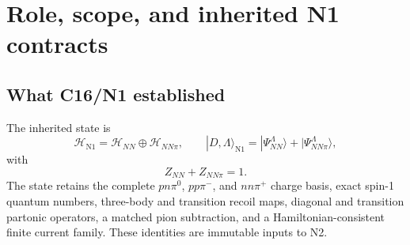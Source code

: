 \documentclass[11pt]{article}
\newcommand{\Hil}{\mathcal H}
\newcommand{\HNN}{\Hil_{NN}}
\newcommand{\HNNpi}{\Hil_{NN\pi}}
\begin{document}
\begin{abstract}
The finite \(NN\oplus NN\pi\) light-front construction supplies the correct
sector algebra but does not by itself define continuum transition strength,
a pole residue, or a complete current basis.  We formulate an N2 theory in
which the \(NN\pi\) sector is a direct integral of charge-, helicity-,
partial-wave-, and regulator-resolved continuum channels.  The same
transition kernel defines a dispersive self-energy, its discontinuity, the
deuteron pole condition, the wave-function residue, and a convergent
finite-volume quadrature sequence.  Currents are obtained by gauging every
retained Hamiltonian term, including nonlocal regulators, momentum-dependent
kernels, sector-changing vertices, induced Feshbach interactions, and
counterterms.  A machine-readable completeness certificate maps each
Hamiltonian term to its charge, current, contact, regulator, and continuity
partners.  The continuity equation is tested separately in the \(NN\to NN\),
\(NN\leftrightarrow NN\pi\), and \(NN\pi\to NN\pi\) blocks and separately in
each charge channel.  A separator trajectory moves pion-like strength among
internal-nucleon, explicit exchange, overlap, and induced descriptions while
leaving matched observables invariant within a declared truncation law.  The
pion-active and transition partonic operators, energy--momentum operators,
and norm kernel are transformed with the Hamiltonian.  A continuum-aware
helicity-resolved coherent pilot and a derived completely positive reduction
are included without identifying either with physical shadowing or partonic
Wilson rescattering.  We give formal requirements, analytic benchmarks,
negative tests, tensor-network and continuum convergence obligations,
software interfaces, and the acceptance boundary to explicit
\(\Delta\Delta\), compact six-quark, and hidden-color sectors.
\end{abstract}

\tableofcontents

\section{Role, scope, and inherited N1 contracts}
\label{sec:scope}

\subsection{What C16/N1 established}

The inherited state is
\begin{equation}
 \Hil_{\mathrm{N1}}=\HNN\oplus\HNNpi,
 \qquad
 |D,\Lambda\rangle_{\mathrm{N1}}
 =|\Psi_{NN}^{\Lambda}\rangle+|\Psi_{NN\pi}^{\Lambda}\rangle,
 \label{eq:n1-state}
\end{equation}
with
\begin{equation}
 Z_{NN}+Z_{NN\pi}=1.
 \label{eq:n1-normalization}
\end{equation}
The state retains the complete
\(pn\pi^0\), \(pp\pi^-\), and \(nn\pi^+\) charge basis, exact spin-1
quantum numbers, three-body and transition recoil maps, diagonal and
transition partonic operators, a matched pion subtraction, and a
Hamiltonian-consistent finite current family.  These identities are immutable
inputs to N2.
\end{document}
